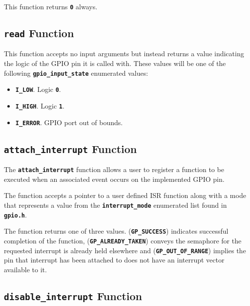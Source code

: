 \documentclass[a4paper, oneside, 11pt, titlepage, onecolumn, openright]{report}
\begin{document}
This function returns \textbf{\texttt{0}} always.

				\subsection{\textbf{\texttt{read}} Function}
					\label{ss:Hardware Abstraction Libraries:gpio Module:read Function}
			
					This function accepts no input arguments but instead returns a value indicating the logic of the GPIO pin it is called with. These values will be one of the following \textbf{\texttt{gpio\_input\_state}} enumerated values:
			
					\begin{itemize}
					
						\item \textbf{\texttt{I\_LOW}}. Logic \textbf{\texttt{0}}.
						
						\item \textbf{\texttt{I\_HIGH}}. Logic \textbf{\texttt{1}}.
						
						\item \textbf{\texttt{I\_ERROR}}. GPIO port out of bounds.
						
					\end{itemize}
			
				\subsection{\textbf{\texttt{attach\_interrupt}} Function}
					\label{ss:Hardware Abstraction Libraries:gpio Module:attach_interrupt Function}
			
					The \textbf{\texttt{attach\_interrupt}} function allows a user to register a function to be executed when an associated event occurs on the implemented GPIO pin.
			
The function accepts a pointer to a user defined ISR function along with a mode that represents a value from the \textbf{\texttt{interrupt\_mode}} enumerated list found in \textbf{\texttt{gpio.h}}. 
			
The function returns one of three values. (\textbf{\texttt{GP\_SUCCESS}}) indicates successful completion of the function, (\textbf{\texttt{GP\_ALREADY\_TAKEN}}) conveys the semaphore for the requested interrupt is already held elsewhere and (\textbf{\texttt{GP\_OUT\_OF\_RANGE}}) implies the pin that interrupt has been attached to does not have an interrupt vector available to it.
			
				\subsection{\textbf{\texttt{disable\_interrupt}} Function}
					\label{ss:Hardware Abstraction Libraries:gpio Module:disable_interrupt Function}
			
\end{document}
